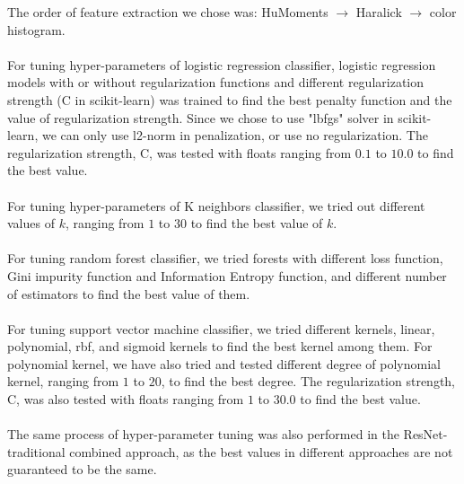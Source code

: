 \documentclass[11.5pt]{article}
\begin{document}
The order of feature extraction we chose was: HuMoments $\rightarrow$ Haralick $\rightarrow$ color histogram.\\ \\
For tuning hyper-parameters of logistic regression classifier, logistic regression models with or without regularization functions and different regularization strength (C in scikit-learn) was trained to find the best penalty function and the value of regularization strength.
Since we chose to use "lbfgs" solver in scikit-learn, we can only use l2-norm in penalization, or use no regularization.
The regularization strength, C, was tested with floats ranging from $0.1$ to $10.0$ to find the best value.\\ \\
For tuning hyper-parameters of K neighbors classifier, we tried out different values of $k$, ranging from $1$ to $30$ to find the best value of $k$.\\ \\
For tuning random forest classifier, we tried forests with different loss function, Gini impurity function and Information Entropy function, and different number of estimators to find the best value of them.\\ \\
For tuning support vector machine classifier, we tried different kernels, linear, polynomial, rbf, and sigmoid kernels to find the best kernel among them.
For polynomial kernel, we have also tried and tested different degree of polynomial kernel, ranging from $1$ to $20$, to find the best degree.
The regularization strength, C, was also tested with floats ranging from $1$ to $30.0$ to find the best value.\\ \\
The same process of hyper-parameter tuning was also performed in the ResNet-traditional combined approach, as the best values in different approaches are not guaranteed to be the same.
\end{document}
